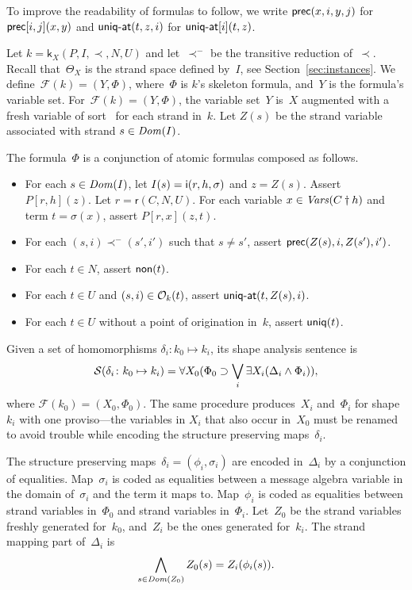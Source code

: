 \documentclass[12pt]{report}
\theoremstyle{definition}
\newcommand{\sdom}{\fn{Dom}}
\newcommand{\svars}{\fn{Vars}}
\newcommand{\role}{\mathsf{r}}
\newcommand{\skel}{\mathsf{k}}
\newcommand{\form}{\mathcal{F}}
\newcommand{\sent}{\mathcal{S}}
\begin{document}
To improve the readability of formulas to follow, we write
$\operatorname{\mathsf{prec}}(x,i,y,j)$ for $\operatorname{\mathsf{prec}}[i,j](x,y)$ and $\operatorname{\mathsf{uniq-at}}(t,z,i)$
for $\operatorname{\mathsf{uniq-at}}[i](t,z)$.

Let $k=\skel_X(P,I,\prec,N,U)$ and let~$\prec^-$ be the transitive
reduction of~$\prec$.  Recall that~$\Theta_X$ is the strand space
defined by~$I$, see Section~\ref{sec:instances}.  We
define~$\form(k)=(Y,\Phi)$, where~$\Phi$ is $k$'s skeleton formula,
and~$Y$ is the formula's variable set.  For~$\form(k)=(Y,\Phi)$, the
variable set~$Y$ is~$X$ augmented with a fresh variable of
sort~ for each strand in~$k$.  Let $Z(s)$ be the strand
variable associated with strand $s\in\sdom(I)$.

The formula~$\Phi$ is a conjunction of atomic formulas composed as
follows.
\begin{itemize}
\item For each $s\in\sdom(I)$, let $I(s)=\operatorname{\mathsf{i}}(r,h,\sigma)$ and
  $z=Z(s)$.  Assert $P[r,h](z)$.  Let $r=\role(C,N,U)$.  For each
  variable $x\in\svars(\prefix{C}{h})$ and term $t=\sigma(x)$, assert
  $P[r,x](z,t)$.
\item For each $(s,i)\prec^-(s',i')$ such that $s\neq s'$, assert
  $\operatorname{\mathsf{prec}}(Z(s),i,Z(s'),i')$.
\item For each $t\in N$, assert $\operatorname{\mathsf{non}}(t)$.
\item For each $t\in U$ and $(s,i)\in\mathcal{O}_k(t)$, assert
  $\operatorname{\mathsf{\mbox{\sf uniq-at}}}(t,Z(s),i)$.
\item For each $t\in U$ without a point of origination in~$k$, assert
  $\operatorname{\mathsf{uniq}}(t)$.
\end{itemize}

Given a set of homomorphisms $\delta_i\colon k_0\mapsto k_i$, its shape
analysis sentence is
\begin{equation}\label{eqn:node-oriented shape sentence}
\sent(\delta_i\colon k_0\mapsto k_i)=\all{X_0}(\Phi_0\supset
\bigvee_i\some{X_i}(\Delta_i\wedge\Phi_i)),
\end{equation}
where $\form(k_0)=(X_0,\Phi_0)$.  The same procedure produces~$X_i$
and~$\Phi_i$ for shape~$k_i$ with one proviso---the variables in
$X_i$ that also occur in~$X_0$ must be renamed to avoid trouble while
encoding the structure preserving maps~$\delta_i$.

The structure preserving maps~$\delta_i=(\phi_i,\sigma_i)$ are encoded
in~$\Delta_i$ by a conjunction of equalities.  Map~$\sigma_i$ is coded
as equalities between a message algebra variable in the domain
of~$\sigma_i$ and the term it maps to.  Map~$\phi_i$ is coded as
equalities between strand variables in~$\Phi_0$ and strand variables
in~$\Phi_i$.  Let~$Z_0$ be the strand variables freshly generated
for~$k_0$, and~$Z_i$ be the ones generated for~$k_i$.  The
strand mapping part of~$\Delta_i$ is
\[\bigwedge_{s\in\sdom(Z_0)}Z_0(s)=Z_i(\phi_i(s)).\]
\end{document}
